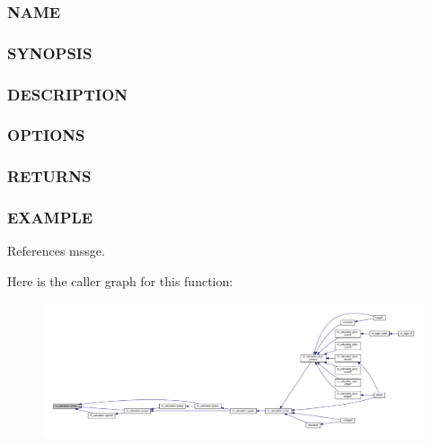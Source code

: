 \subsubsection*{N\+A\+ME}

\subsubsection*{S\+Y\+N\+O\+P\+S\+IS}

\subsubsection*{D\+E\+S\+C\+R\+I\+P\+T\+I\+ON}

\subsubsection*{O\+P\+T\+I\+O\+NS}

\subsubsection*{R\+E\+T\+U\+R\+NS}

\subsubsection*{E\+X\+A\+M\+P\+LE}

References mssge.

Here is the caller graph for this function\+:
\nopagebreak
\begin{figure}[H]
\begin{center}
\leavevmode
\includegraphics[width=350pt]{namespacem__calculator_a5031622e3d493b738ac425f1fa454a60_icgraph}
\end{center}
\end{figure}
\mbox{\label{namespacem__calculator_a1c053df0b605f7d96a5982c44a9a1d11}} 
